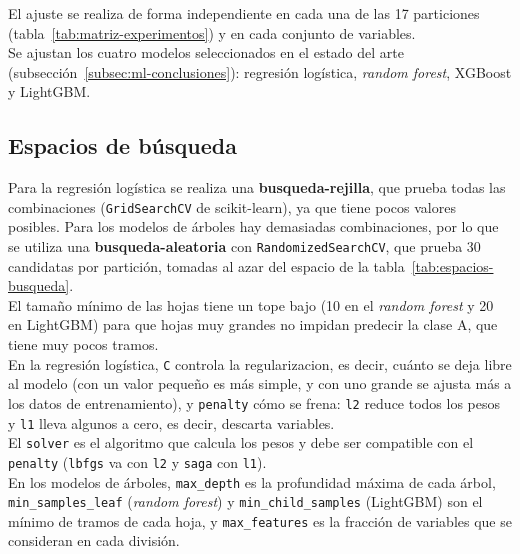 El ajuste se realiza de forma independiente en cada una de las 17 particiones (tabla~\ref{tab:matriz-experimentos}) y en cada conjunto de variables.
\\

Se ajustan los cuatro modelos seleccionados en el estado del arte (subsección~\ref{subsec:ml-conclusiones}): regresión logística, \textit{random forest}, XGBoost y LightGBM.
\\

\subsection{Espacios de búsqueda}
\label{subsec:dis-espacios-busqueda}

Para la regresión logística se realiza una \textbf{\gls{busqueda-rejilla}}, que prueba todas las combinaciones (\texttt{GridSearchCV} de scikit-learn), ya que tiene pocos valores posibles. Para los modelos de árboles hay demasiadas combinaciones, por lo que se utiliza una \textbf{\gls{busqueda-aleatoria}} con \texttt{RandomizedSearchCV}, que prueba 30 candidatas por partición, tomadas al azar del espacio de la tabla~\ref{tab:espacios-busqueda}.
\\

El tamaño mínimo de las \glspl{hoja} tiene un tope bajo (10 en el \textit{random forest} y 20 en LightGBM) para que hojas muy grandes no impidan predecir la clase A, que tiene muy pocos tramos.
\\

En la regresión logística, \texttt{C} controla la \gls{regularizacion}, es decir, cuánto se deja libre al modelo (con un valor pequeño es más simple, y con uno grande se ajusta más a los datos de entrenamiento), y \texttt{penalty} cómo se frena: \texttt{l2} reduce todos los pesos y \texttt{l1} lleva algunos a cero, es decir, descarta variables.
\\

El \texttt{solver} es el algoritmo que calcula los pesos y debe ser compatible con el \texttt{penalty} (\texttt{lbfgs} va con \texttt{l2} y \texttt{saga} con \texttt{l1}).
\\

En los modelos de árboles, \texttt{max\_depth} es la profundidad máxima de cada árbol, \texttt{min\_samples\_leaf} (\textit{random forest}) y \texttt{min\_child\_samples} (LightGBM) son el mínimo de tramos de cada hoja, y \texttt{max\_features} es la fracción de variables que se consideran en cada división.
\\

